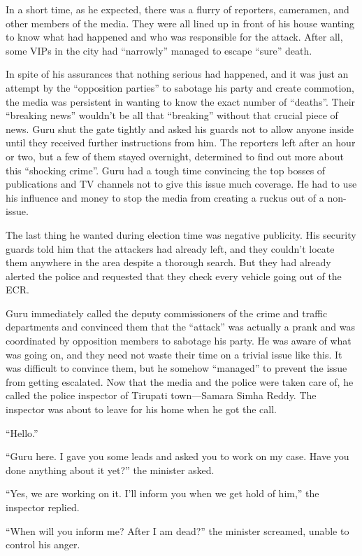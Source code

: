 In a short time, as he expected, there was a flurry of reporters, cameramen,
and other members of the media. They were all lined up in front of his house
wanting to know what had happened and who was responsible for the attack. After
all, some VIPs in the city had “narrowly” managed to escape “sure” death.

In spite of his assurances that nothing serious had happened, and it was just an
attempt by the “opposition parties” to sabotage his party and create commotion,
the media was persistent in wanting to know the exact number of “deaths”. Their “breaking
news” wouldn't be all that “breaking” without that crucial piece of news. Guru
shut the gate tightly and asked his guards not to allow anyone inside until they
received further instructions from him. The reporters left after an hour or two,
but a few of them stayed overnight, determined to find out more about this
“shocking crime”. Guru had a tough time convincing the top bosses of
publications and TV channels not to give this issue much coverage. He had to use
his influence and money to stop the media from creating a ruckus out of a non-issue.

The last thing he wanted during election time was negative publicity. His
security guards told him that the attackers had already left, and they couldn't
locate them anywhere in the area despite a thorough search. But they had already
alerted the police and requested that they check every vehicle going out of the ECR.

Guru immediately called the deputy commissioners of the crime and
traffic departments and convinced them that the “attack” was actually a prank
and was coordinated by opposition members to sabotage his party. He was aware of
what was going on, and they need not waste their time on a trivial issue like
this. It was difficult to convince them, but he somehow “managed” to prevent the
issue from getting escalated.  Now that the media and the police were taken care of,
he called the police inspector of Tirupati town—Samara Simha Reddy. The
inspector was about to leave for his home when he got the call.

“Hello.”

“Guru here. I gave you some leads and asked you to work on my case. Have you
done anything about it yet?” the minister asked.

“Yes, we are working on it. I'll inform you when we get hold of him,” the
inspector replied.

“When will you inform me? After I am dead?” the minister screamed, unable to
control his anger.

